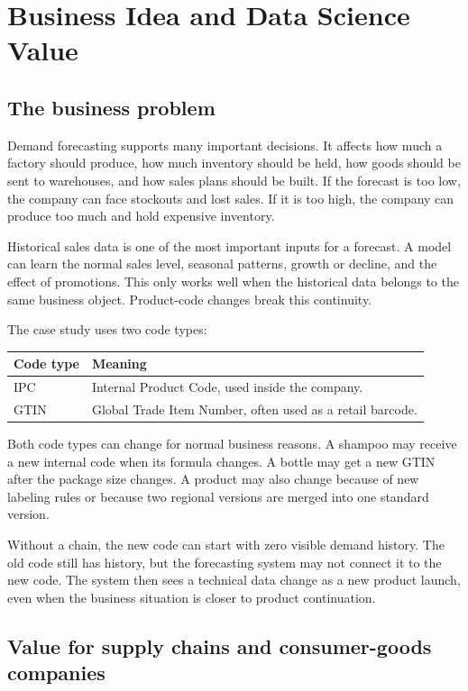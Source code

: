 \documentclass[12pt]{article}
\begin{document}
\section{Business Idea and Data Science Value}

\subsection{The business problem}

Demand forecasting supports many important decisions. It affects how much a factory should produce, how much inventory should be held, how goods should be sent to warehouses, and how sales plans should be built. If the forecast is too low, the company can face stockouts and lost sales. If it is too high, the company can produce too much and hold expensive inventory.

Historical sales data is one of the most important inputs for a forecast. A model can learn the normal sales level, seasonal patterns, growth or decline, and the effect of promotions. This only works well when the historical data belongs to the same business object. Product-code changes break this continuity.

The case study uses two code types:

\begin{longtable}{|p{}|p{}|}
\hline
\textbf{Code type} & \textbf{Meaning} \\
\hline
IPC & Internal Product Code, used inside the company. \\
\hline
GTIN & Global Trade Item Number, often used as a retail barcode. \\
\hline
\end{longtable}

Both code types can change for normal business reasons. A shampoo may receive a new internal code when its formula changes. A bottle may get a new GTIN after the package size changes. A product may also change because of new labeling rules or because two regional versions are merged into one standard version.

Without a chain, the new code can start with zero visible demand history. The old code still has history, but the forecasting system may not connect it to the new code. The system then sees a technical data change as a new product launch, even when the business situation is closer to product continuation.

\subsection{Value for supply chains and consumer-goods companies}
\end{document}
